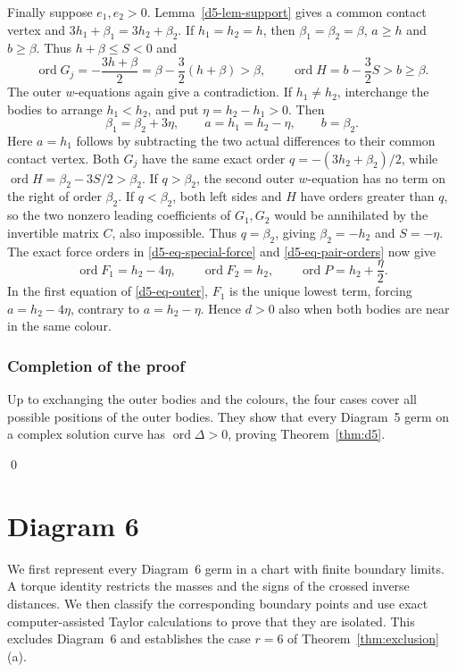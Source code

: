 \documentclass[Threeside,11pt]{article}
\theoremstyle{definition}
\theoremstyle{remark}
\numberwithin{equation}{section}
\theoremstyle{remark}
\newcommand{\ord}{\operatorname{ord}}
\begin{document}
{Finally suppose $e_1,e_2>0$. Lemma~\ref{d5-lem-support} gives a
common contact vertex and $3h_1+\beta_1=3h_2+\beta_2$.
If $h_1=h_2=h$, then $\beta_1=\beta_2=\beta$, $a\ge h$ and $b\ge\beta$.
Thus $h+\beta\le S<0$ and
\[
 \ord G_j=-\frac{3h+\beta}{2}
 =\beta-\frac32(h+\beta)>\beta,\qquad
 \ord H=b-\frac32S>b\ge\beta.
\]
The outer $w$-equations again give a contradiction.
If $h_1\ne h_2$, interchange the bodies to arrange $h_1<h_2$, and put
$\eta=h_2-h_1>0$.  Then
\[
 \beta_1=\beta_2+3\eta,\qquad
 a=h_1=h_2-\eta,\qquad b=\beta_2.
\]
Here $a=h_1$ follows by subtracting the two actual differences to their common
contact vertex. Both $G_j$ have the same exact order
$q=-(3h_2+\beta_2)/2$, while $\ord H=\beta_2-3S/2>\beta_2$.
If $q>\beta_2$, the second outer $w$-equation has no term on the right of order
$\beta_2$.  If $q<\beta_2$, both left sides and $H$ have orders greater than
$q$, so the two nonzero leading coefficients of $G_1,G_2$ would be annihilated
by the invertible matrix $C$, also impossible.  Thus $q=\beta_2$, giving
$\beta_2=-h_2$ and $S=-\eta$.
The exact force orders in \eqref{d5-eq-special-force} and \eqref{d5-eq-pair-orders} now give
\[
 \ord F_1=h_2-4\eta,\qquad
 \ord F_2=h_2,\qquad \ord P=h_2+\frac\eta2.
\]
In the first equation of \eqref{d5-eq-outer}, $F_1$ is the unique lowest term, forcing
$a=h_2-4\eta$, contrary to $a=h_2-\eta$.
Hence $d>0$ also when both bodies are near in the same colour.

\subsubsection{Completion of the proof}
Up to exchanging the outer bodies and the colours, the four cases cover
all possible positions of the outer bodies.  They show that every Diagram~5
germ on a complex solution curve has $\ord\Delta>0$, proving
Theorem~\ref{thm:d5}.

\qed
}

\section{Diagram 6}\label{sec:d6}

We first represent every Diagram~6 germ in a chart with finite boundary limits.
A torque identity restricts the masses and the signs of the crossed inverse
distances. We then classify the corresponding boundary points and use exact
computer-assisted Taylor calculations to prove that they are isolated. This
excludes Diagram~6 and establishes the case $r=6$ of
Theorem~\ref{thm:exclusion}(a).
\end{document}
